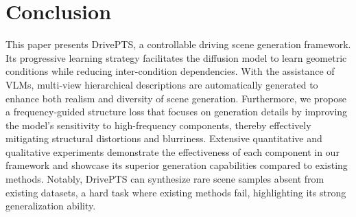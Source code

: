\section{Conclusion}
This paper presents DrivePTS, a controllable driving scene generation framework. 
Its progressive learning strategy facilitates the diffusion model to learn geometric conditions while reducing inter-condition dependencies. 
With the assistance of VLMs, multi-view hierarchical descriptions are automatically generated to enhance both realism and diversity of scene generation. 
Furthermore, we propose a frequency-guided structure loss that focuses on generation details by improving the model's sensitivity to high-frequency components, thereby effectively mitigating structural distortions and blurriness.
Extensive quantitative and qualitative experiments demonstrate the effectiveness of each component in our framework and showcase its superior generation capabilities compared to existing methods. 
Notably, DrivePTS can synthesize rare scene samples absent from existing datasets, a hard task where existing methods fail, highlighting its strong generalization ability.

